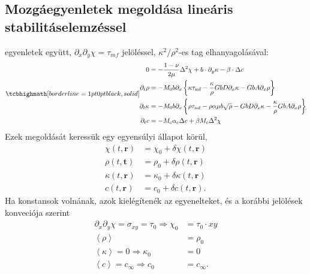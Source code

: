 \documentclass[10pt,a4paper]{scrartcl}
\let\mathbf\bm
\begin{document}
\subsection{Mozgáegyenletek megoldása lineáris stabilitáselemzéssel}
 egyenletek együtt, $\partial_x \partial_y \chi = {\tau _{mf}}$ jelöléssel, $\kappa^2/\rho^2$-es tag elhanyagolásával:
\begin{gather}
\tcbhighmath[borderline={1pt}{0pt}{black,solid}]{
\begin{aligned}
0 & = - \frac{{1 - \nu }}{{2\mu }}{\Delta ^2}\chi  + b\cdot\partial_y\kappa - \beta  \cdot \Delta c \\ 
    {\partial _t}\rho  &  =  - {M_0}b{\partial _x}\left\{ {\kappa {\tau _{{\text{mf}}}} - \frac{\kappa }{\rho }GbD{\partial _x}\kappa  - GbA{\partial _x}\rho } \right\} \\ 
  {\partial _t}\kappa  &  =  - {M_0}b{\partial _x}\left\{ {\rho {\tau _{{\text{mf}}}} - \rho \alpha \mu b\sqrt \rho - GbD{\partial _x}\kappa  - \frac{\kappa }{\rho } GbA{\partial _x}\rho } \right\} \\
  \partial_t c & =  - {M_c}{\alpha _c}\Delta c + \beta {M_c}\Delta^2 \chi
\end{aligned}  }
\end{gather}
Ezek megoldását keressük egy egyensúlyi állapot körül,
\[\begin{aligned}
  \chi \left( {t,{\mathbf{r}}} \right) &  = {\chi _0} + \delta \chi \left( {t,{\mathbf{r}}} \right) \\ 
  \rho \left( {t,{\mathbf{t}}} \right) &  = {\rho _0} + \delta \rho \left( {t,{\mathbf{r}}} \right) \\ 
  \kappa \left( {t,{\mathbf{r}}} \right) &  = {\kappa _0} + \delta \kappa \left( {t,{\mathbf{r}}} \right) \\ 
  c\left( {t,{\mathbf{r}}} \right) &  = {c_0} + \delta c\left( {t,{\mathbf{r}}} \right).
\end{aligned} \]
Ha konstansok volnának, azok kielégítenék az egyenelteket, és a korábbi jelölések konveciója szerint 
\[\begin{aligned}
  {\partial _x}{\partial _y}\chi  = {\sigma _{xy}} = {\tau _0} \Rightarrow {\chi _0} &  = {\tau _0} \cdot xy \\ 
  \left\langle \rho  \right\rangle  &  = {\rho _0} \\ 
  \left\langle \kappa  \right\rangle  = 0 \Rightarrow {\kappa _0} &  = 0 \\ 
  \left\langle c \right\rangle  = {c_\infty } \Rightarrow {c_0} &  = {c_\infty }. \\ 
\end{aligned} \]
\end{document}
